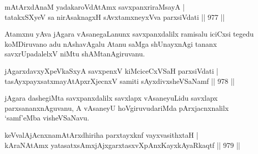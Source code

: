 
\begin{shl}
mAtArxdAnaM yadakaroVdAtAmx savxpanxriraMsayA | \\
tatakxSXyeV sa nirAsaknagxH sAvxtamxneyxVva parxsiVdati \hfill||  977 ||  
\end{shl}

\begin{artha}
Atamxnu yAva jAgara vAsanegaLanunx savxpanxdalilx ramisalu iciCxsi tegedu koMDiruvano adu nAshavAgalu Atanu saMga shUnayxnAgi tananx savxrUpadalelxV niMtu shAMtanAgiruvanu.
\end{artha}


\begin{shl}
jAgarxdavxyXpeVkaSxyA savxpenxV kiMciceCxVSaH parxsiVdati | \\
tasAyxpayxsatxmayAtApxrXjecnxV samiti sAyxdivxsheVSaNamf \hfill||  978 ||  
\end{shl}

\begin{artha}
jAgara dashegiMta savxpanxdalilx savxlapx vAsaneyuLidu savxlapx parxsananxnAguvanu, A vAsaneyU hoVgiruvudariMda pArxjacnxnalilx `samf'eMba visheVSaNavu.
\end{artha}

\begin{shl}
keVvalAjAcnxnamAtArxdhiriha parxtayxknf vayxvasithxtaH | \\
kAraNAtAmx yatasatxsAmxjAjxgarxtasxvXpAnxKayxkAyaRkaqtf \hfill||  979 ||  
\end{shl}

